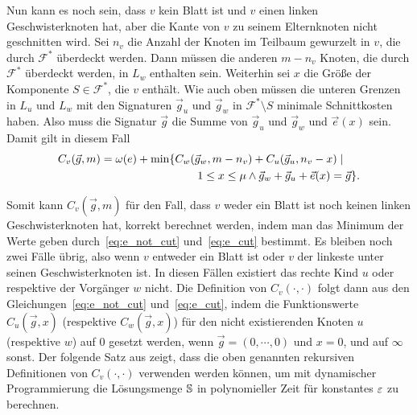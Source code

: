 Nun kann es noch sein, dass $v$ kein Blatt ist und $v$ einen linken Geschwisterknoten hat, aber die Kante von $v$ zu seinem Elternknoten nicht geschnitten wird.
Sei $n_v$ die Anzahl der Knoten im Teilbaum gewurzelt in $v$, die durch $\mathcal{F}^*$ überdeckt werden.
Dann müssen die anderen $m - n_v$ Knoten, die durch $\mathcal{F}^*$ überdeckt werden, in $L_w$ enthalten sein.
Weiterhin sei $x$ die Größe der Komponente $S \in \mathcal{F}^*$, die $v$ enthält.
Wie auch oben müssen die unteren Grenzen in $L_u$ und $L_w$ mit den Signaturen $\vec{g}_u$ und $\vec{g}_w$ in $\mathcal{F}^* \setminus {S}$ minimale Schnittkosten haben.
Also muss die Signatur $\vec{g}$ die Summe von $\vec{g}_u$ und $\vec{g}_w$ und $\vec{e}(x)$ sein.
Damit gilt in diesem Fall
\begin{equation}\label{eq:e_cut}
    \begin{aligned}
        C_v(\vec{g}, m) = \omega(e) + \min \{ & C_w(\vec{g}_w, m - n_v) + C_u(\vec{g}_u, n_v - x) \mid \\ & \qquad 1 \leq x \leq \mu \land \vec{g}_w + \vec{g}_u + \vec{e}(x) = \vec{g} \}.
    \end{aligned}
\end{equation}

Somit kann $C_v(\vec{g}, m)$ für den Fall, dass $v$ weder ein Blatt ist noch keinen linken Geschwisterknoten hat, korrekt berechnet werden, indem man das Minimum der Werte geben durch~\eqref{eq:e_not_cut} und~\eqref{eq:e_cut} bestimmt.
Es bleiben noch zwei Fälle übrig, also wenn $v$ entweder ein Blatt ist oder $v$ der linkeste unter seinen Geschwisterknoten ist.
In diesen Fällen existiert das rechte Kind $u$ oder respektive der Vorgänger $w$ nicht.
Die Definition von $C_v(\cdot, \cdot)$ folgt dann aus den Gleichungen~\eqref{eq:e_not_cut} und~\eqref{eq:e_cut}, indem die Funktionswerte $C_u(\vec{g}, x)$ (respektive $C_w(\vec{g}, x)$) für den nicht existierenden Knoten $u$ (respektive $w$) auf $0$ gesetzt werden, wenn $\vec{g} = (0, \cdots, 0)$ und $x = 0$, und auf $\infty$ sonst. 
Der folgende Satz aus \parencite{ff13} zeigt, dass die oben genannten rekursiven Definitionen von $C_v(\cdot, \cdot)$ verwenden werden können, um mit dynamischer Programmierung die Lösungsmenge $\mathbb{S}$ in polynomieller Zeit für konstantes $\varepsilon$ zu berechnen.

